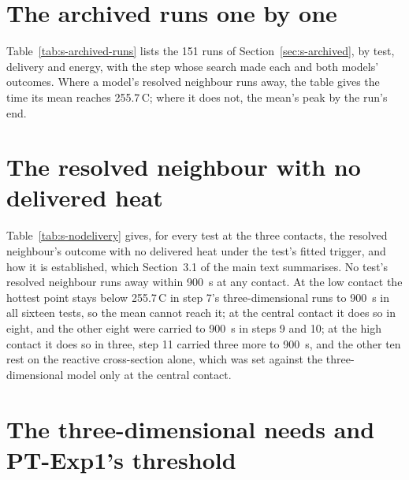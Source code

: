 \documentclass[preprint,12pt]{elsarticle}
\newcommand{\degC}{\,\textdegree C}
\begin{document}
\section{The archived runs one by one}
\label{sec:s-archived-runs}

Table~\ref{tab:s-archived-runs} lists the 151 runs of Section~\ref{sec:s-archived}, by test, delivery and energy, with the step whose search made each and both models' outcomes. Where a model's resolved neighbour runs away, the table gives the time its mean reaches 255.7\degC; where it does not, the mean's peak by the run's end.


\section{The resolved neighbour with no delivered heat}
\label{sec:s-nodelivery}

Table~\ref{tab:s-nodelivery} gives, for every test at the three contacts, the resolved neighbour's outcome with no delivered heat under the test's fitted trigger, and how it is established, which Section~3.1 of the main text summarises. No test's resolved neighbour runs away within 900~s at any contact. At the low contact the hottest point stays below 255.7\degC{} in step 7's three-dimensional runs to 900~s in all sixteen tests, so the mean cannot reach it; at the central contact it does so in eight, and the other eight were carried to 900~s in steps 9 and 10; at the high contact it does so in three, step 11 carried three more to 900~s, and the other ten rest on the reactive cross-section alone, which was set against the three-dimensional model only at the central contact.


\section{The three-dimensional needs and PT-Exp1's threshold}
\label{sec:s-step16}
\end{document}
